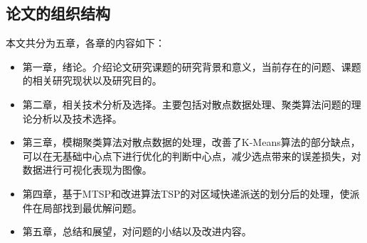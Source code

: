 \subsection{论文的组织结构}
\par 本文共分为五章，各章的内容如下： 
\begin{itemize}
    \item 第一章，绪论。介绍论文研究课题的研究背景和意义，当前存在的问题、课题的相关研究现状以及研究目的。
    \item 第二章，相关技术分析及选择。主要包括对散点数据处理、聚类算法问题的理论分析以及技术选择。
    \item  第三章，模糊聚类算法对散点数据的处理，改善了\rm{K-Means}算法的部分缺点，可以在无基础中心点下进行优化的判断中心点，减少选点带来的误差损失，对数据进行可视化表现为图像。
    \item 第四章，基于MTSP和改进算法TSP的对区域快递派送的划分后的处理，使派件在局部找到最优解问题。
    \item 第五章，总结和展望，对问题的小结以及改进内容。
\end{itemize}